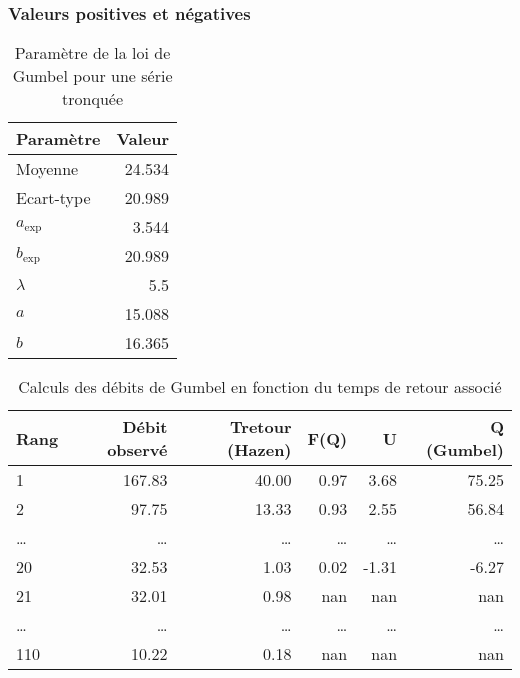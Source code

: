 \subsubsection{Valeurs positives et négatives}
\begin{table}[H]
    \centering
    \begin{tabular}{l|r}
        \hline
        \textbf{Paramètre} & \textbf{Valeur} \\
        \hline
        Moyenne            & 24.534          \\
        Ecart-type         & 20.989          \\
        \midrule
        $a_\text{exp}$     & 3.544           \\
        $b_\text{exp}$     & 20.989          \\
        \midrule
        $\lambda$          & 5.5             \\
        $a$                & 15.088          \\
        $b$                & 16.365          \\
        \hline
    \end{tabular}
    \caption{Paramètre de la loi de Gumbel pour une série tronquée}
    \label{tab:param_Gumbel_tronquees}
\end{table}

\begin{table}[H]
    \centering
    \begin{tabular}{l|r|r|r|r|r}
        \hline
        \textbf{Rang} & \textbf{Débit observé} & \textbf{Tretour (Hazen)} & \textbf{F(Q)} & \textbf{U} & \textbf{Q (Gumbel)} \\
        \hline
        1             & 167.83                 & 40.00                    & 0.97          & 3.68       & 75.25               \\
        2             & 97.75                  & 13.33                    & 0.93          & 2.55       & 56.84               \\
        \dots         & \dots                  & \dots                    & \dots         & \dots      & \dots               \\
        20            & 32.53                  & 1.03                     & 0.02          & -1.31      & -6.27               \\
        21            & 32.01                  & 0.98                     & nan           & nan        & nan                 \\
        \dots         & \dots                  & \dots                    & \dots         & \dots      & \dots               \\
        110           & 10.22                  & 0.18                     & nan           & nan        & nan                 \\
        \hline
    \end{tabular}
    \caption{Calculs des débits de Gumbel en fonction du temps de retour associé}
    \label{tab:gumbelcalcul_tronquees}
\end{table}


